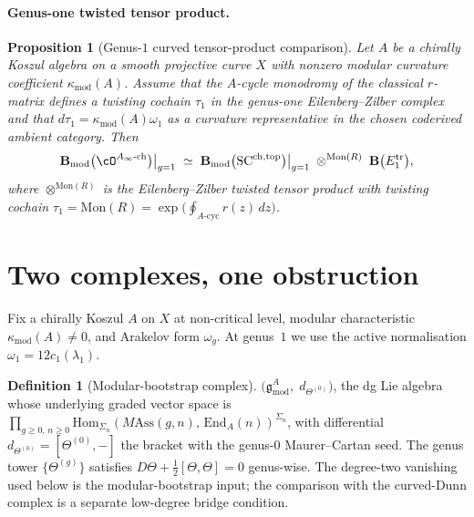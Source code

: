 \documentclass[11pt]{amsart}
\newtheorem{proposition}[theorem]{Proposition}
\theoremstyle{definition}
\newtheorem{definition}[theorem]{Definition}
\theoremstyle{remark}
\providecommand{\Ainf}{A_\infty}
\providecommand{\Bmod}{\mathbf{B}_{\mathrm{mod}}}
\begin{document}
\paragraph{Genus-one twisted tensor product.}
\begin{proposition}[Genus-$1$ curved tensor-product comparison]%
\label{prop:genus1-twisted-tensor-product-standalone}%
Let $A$ be a chirally Koszul algebra on a smooth projective curve
$X$ with nonzero modular curvature coefficient
$\kappa_{\mathrm{mod}}(A)$. Assume that the $A$-cycle monodromy of the
classical $r$-matrix defines a twisting cochain $\tau_1$ in the
genus-one Eilenberg--Zilber complex and that
$d\tau_1=\kappa_{\mathrm{mod}}(A)\omega_1$ as a curvature
representative in the chosen coderived ambient category. Then
\[
  \Bmod\bigl(\cO^{\Ainf\text{-ch}}\bigr)\big|_{g=1}
  \;\simeq\;
  \Bmod\bigl(\mathrm{SC}^{\mathrm{ch,top}}\bigr)\big|_{g=1}
  \;\otimes^{\mathrm{Mon}(R)}\;
  \mathbf{B}\bigl(E_1^{\mathrm{tr}}\bigr),
\]
where $\otimes^{\mathrm{Mon}(R)}$ is the Eilenberg--Zilber twisted
tensor product with twisting cochain
$\tau_1 = \mathrm{Mon}(R) = \exp\!\bigl(\oint_{A\text{-cyc}} r(z)\,
dz\bigr)$.
\end{proposition}

\section{Two complexes, one obstruction}
\label{sec:two-complexes-bridge}

Fix a chirally Koszul $A$ on $X$ at non-critical level, modular
characteristic $\kappa_{\mathrm{mod}}(A) \neq 0$, and Arakelov form
$\omega_g$. At genus~$1$ we use the active normalisation
$\omega_1=12c_1(\lambda_1)$.

\begin{definition}[Modular-bootstrap complex]%
\label{def:modular-bootstrap-complex-standalone}%
$\bigl(\mathfrak{g}^A_{\mathrm{mod}},\; d_{\Theta^{(0)}}\bigr)$, the dg
Lie algebra whose underlying graded vector space is
$\prod_{g \ge 0,\, n \ge 0} \mathrm{Hom}_{\Sigma_n}(M\mathrm{Ass}(g,
n),\, \mathrm{End}_A(n))^{\Sigma_n}$, with differential
$d_{\Theta^{(0)}} = [\Theta^{(0)}, -]$ the bracket with the genus-$0$
Maurer--Cartan seed. The genus tower $\{\Theta^{(g)}\}$ satisfies
$D\Theta + \tfrac{1}{2}[\Theta, \Theta] = 0$ genus-wise.
The degree-two vanishing used below is the modular-bootstrap input;
the comparison with the curved-Dunn complex is a separate low-degree
bridge condition.
\end{definition}
\end{document}
